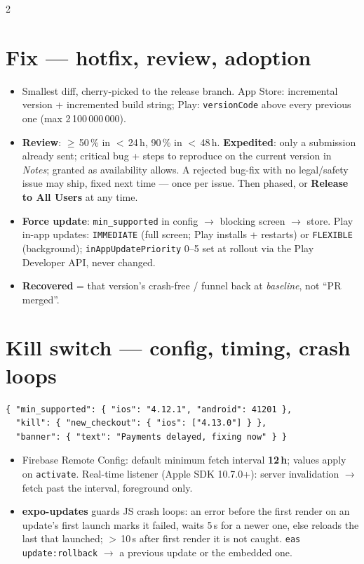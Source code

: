 \documentclass[8pt]{extarticle}
\newcommand\ct[1]{\texttt{#1}}
\begin{document}
\begin{multicols}{2}
\section{Fix — hotfix, review, adoption}
\begin{itemize}
  \item Smallest diff, cherry-picked to the release branch. App Store: incremental version + incremented build
        string; Play: \ct{versionCode} above every previous one (max 2\,100\,000\,000).
  \item \textbf{Review}: $\ge$\,50\,\% in $<$\,24\,h, 90\,\% in $<$\,48\,h. \textbf{Expedited}: only a submission
        already sent; critical bug + steps to reproduce on the current version in \emph{Notes}; granted as
        availability allows. A rejected bug-fix with no legal/safety issue may ship, fixed next time — once per
        issue. Then phased, or \textbf{Release to All Users} at any time.
  \item \textbf{Force update}: \ct{min\_supported} in config $\to$ blocking screen $\to$ store. Play in-app updates:
        \ct{IMMEDIATE} (full screen; Play installs + restarts) or \ct{FLEXIBLE} (background);
        \ct{inAppUpdatePriority} 0–5 set at rollout via the Play Developer API, never changed.
  \item \textbf{Recovered} = that version's crash-free / funnel back at \emph{baseline}, not ``PR merged''.
\end{itemize}

\section{Kill switch — config, timing, crash loops}
\begin{lstlisting}[language=JSONSheet]
{ "min_supported": { "ios": "4.12.1", "android": 41201 },
  "kill": { "new_checkout": { "ios": ["4.13.0"] } },
  "banner": { "text": "Payments delayed, fixing now" } }
\end{lstlisting}
\begin{itemize}
  \item Firebase Remote Config: default minimum fetch interval \textbf{12\,h}; values apply on \ct{activate}.
        Real-time listener (Apple SDK 10.7.0+): server invalidation $\to$ fetch past the interval, foreground only.
  \item \textbf{expo-updates} guards JS crash loops: an error before the first render on an update's first launch
        marks it failed, waits 5\,s for a newer one, else reloads the last that launched; $>$\,10\,s after first
        render it is not caught. \ct{eas update:rollback} $\to$ a previous update or the embedded one.
\end{itemize}


\end{multicols}
\end{document}
